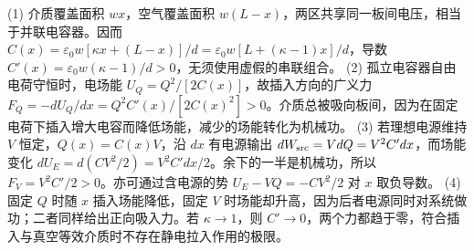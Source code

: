 (1) 介质覆盖面积 \(wx\)，空气覆盖面积 \(w(L-x)\)，两区共享同一板间电压，相当于并联电容器。因而 \(C(x)=\varepsilon_0w[\kappa x+(L-x)]/d=\varepsilon_0w[L+(\kappa-1)x]/d\)，导数 \(C'(x)=\varepsilon_0w(\kappa-1)/d>0\)，无须使用虚假的串联组合。
(2) 孤立电容器自由电荷守恒时，电场能 \(U_Q=Q^2/[2C(x)]\)，故插入方向的广义力 \(F_Q=-dU_Q/dx=Q^2C'(x)/[2C(x)^2]>0\)。介质总被吸向板间，因为在固定电荷下插入增大电容而降低场能，减少的场能转化为机械功。
(3) 若理想电源维持 \(V\) 恒定，\(Q(x)=C(x)V\)，沿 \(dx\) 有电源输出 \(dW_{\rm src}=VdQ=V^2C'dx\)，而场能变化 \(dU_E=d(CV^2/2)=V^2C'dx/2\)。余下的一半是机械功，所以 \(F_V=V^2C'/2>0\)。亦可通过含电源的势 \(U_E-VQ=-CV^2/2\) 对 \(x\) 取负导数。
(4) 固定 \(Q\) 时随 \(x\) 插入场能降低，固定 \(V\) 时场能却升高，因为后者电源同时对系统做功；二者同样给出正向吸入力。若 \(\kappa\to1\)，则 \(C'\to0\)，两个力都趋于零，符合插入与真空等效介质时不存在静电拉入作用的极限。
